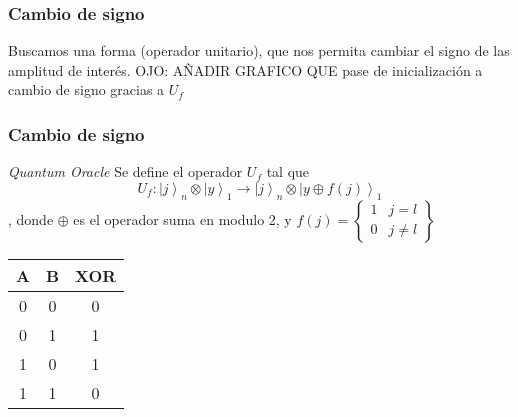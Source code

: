 \begin{frame}
	\frametitle{Cambio de signo}
	Buscamos una forma (operador unitario), que nos permita cambiar el signo de las amplitud de interés.
	OJO: AÑADIR GRAFICO QUE pase de inicialización a cambio de signo gracias a $U_f$ 
\end{frame}
\begin{frame}
	\frametitle{Cambio de signo}
	\begin{block}{\textit{Quantum Oracle}}
		Se define el operador $U_f$ tal que 
		\[U_{f}:\left.|j\right\rangle _{n}\otimes\left.|y\right\rangle _{1}\rightarrow\left.|j\right\rangle _{n}\otimes\left.|y\oplus f\left(j\right)\right\rangle _{1}\],
		donde $\oplus$ es el operador suma en modulo 2, y $f\left(j\right)=\left\{ \begin{array}{cc}
		1  & j=l\\
		0  & j\neq l
		\end{array}\right\} $
	\end{block}
	
	
	\begin{center}
		\begin{tabular}{|c c |c|} 
			\hline
			A & B & XOR \\ 
			\hline\hline
			0&0&0  \\ 
			\hline
			0&1&1  \\ 
			\hline
			1&0&1  \\
			\hline
			1&1&0 \\
			\hline
		\end{tabular}
	\end{center}
\end{frame}

